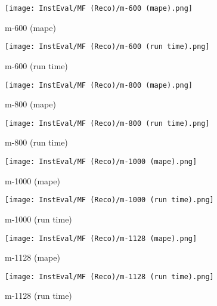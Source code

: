 \documentclass[12pt]{article}
\begin{document}
\begin{figure}[H]
\centering
    \begin{minipage}{0.45\textwidth}
        \centering
        \texttt{[image: InstEval/MF (Reco)/m-600 (mape).png]}
        \caption{m-600 (mape)}
        
    \end{minipage}\hfill
    \begin{minipage}{0.45\textwidth}
        \centering
        \texttt{[image: InstEval/MF (Reco)/m-600 (run time).png]}
        \caption{m-600 (run time)}
    \end{minipage}
\end{figure}

\begin{figure}[H]
\centering
    \begin{minipage}{0.45\textwidth}
        \centering
        \texttt{[image: InstEval/MF (Reco)/m-800 (mape).png]}
        \caption{m-800 (mape)}
        
    \end{minipage}\hfill
    \begin{minipage}{0.45\textwidth}
        \centering
        \texttt{[image: InstEval/MF (Reco)/m-800 (run time).png]}
        \caption{m-800 (run time)}
    \end{minipage}
\end{figure}

\begin{figure}[H]
\centering
    \begin{minipage}{0.45\textwidth}
        \centering
        \texttt{[image: InstEval/MF (Reco)/m-1000 (mape).png]}
        \caption{m-1000 (mape)}
        
    \end{minipage}\hfill
    \begin{minipage}{0.45\textwidth}
        \centering
        \texttt{[image: InstEval/MF (Reco)/m-1000 (run time).png]}
        \caption{m-1000 (run time)}
    \end{minipage}
\end{figure}

\begin{figure}[H]
\centering
    \begin{minipage}{0.45\textwidth}
        \centering
        \texttt{[image: InstEval/MF (Reco)/m-1128 (mape).png]}
        \caption{m-1128 (mape)}
        
    \end{minipage}\hfill
    \begin{minipage}{0.45\textwidth}
        \centering
        \texttt{[image: InstEval/MF (Reco)/m-1128 (run time).png]}
        \caption{m-1128 (run time)}
    \end{minipage}
\end{figure}
\end{document}
